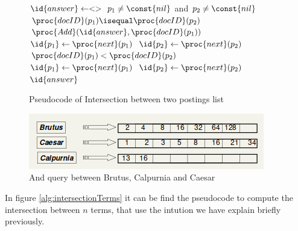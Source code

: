 \begin{figure}
    \caption{Pseudocode of Intersection between two postings list}
    \label{alg:intersection}
    \begin{codebox}
        \li $\id{answer} \gets <> $
        \li \While $p_1 \neq \const{nil}$ and $p_2 \neq \const{nil}$ 
            \Do
        \li     \If $\proc{docID}(p_1) \isequal \proc{docID}(p_2)$
        \li         \Then $\proc{Add}(\id{answer}, \proc{docID}(p_1))$
        \li               $\id{p_1} \gets \proc{next}(p_1)$
        \li               $\id{p_2} \gets \proc{next}(p_2)$
        \li     \ElseIf $\proc{docID}(p_1) < \proc{docID}(p_2)$
        \li         \Then $\id{p_1} \gets \proc{next}(p_1)$
        \li     \Else $\id{p_2} \gets \proc{next}(p_2)$
            \End
        \li \Return $\id{answer}$
    \end{codebox}
\end{figure}
\begin{figure}
    \caption{And query between Brutus, Calpurnia and Caesar}
    \label{img:andQuery}
    \includegraphics[width=\textwidth]{Images/andQuery}
\end{figure}
In figure \ref{alg:intersectionTerms} it can be find the pseudocode to compute the intersection between 
$n$ terms, that use the intution we have explain briefly previously.

